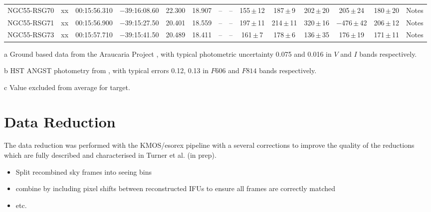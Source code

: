 \begin{table}
\begin{threeparttable}
\begin{tabular}{lrcccccccccccl}
NGC55-RSG70 & xx & 00:15:56.310 & $-$39:16:08.60& 22.300 & 18.907 & --   & --    &   155\,$\pm$\,12 &  187\,$\pm$\,9   &     202\,$\pm$\,20 &   205\,$\pm$\,24             & 180\,$\pm$\,20 & Notes\\
NGC55-RSG71 & xx & 00:15:56.900 & $-$39:15:27.50& 20.401 & 18.559 & --   & --    &   197\,$\pm$\,11 &  214\,$\pm$\,11  &320\,$\pm$\,16\tnote{c}&$-$476\,$\pm$\,42\tnote{c} & 206\,$\pm$\,12 & Notes\\
NGC55-RSG73 & xx & 00:15:57.710 & $-$39:15:41.50& 20.489 & 18.411 & --   & --    &   161\,$\pm$\,7  &  178\,$\pm$\,6   &     136\,$\pm$\,35 &   176\,$\pm$\,19             & 171\,$\pm$\,11 & Notes\\

\hline
\end{tabular}
\begin{tablenotes}
  \item [a] Ground based data from the Araucaria Project
  \protect\cite{2006AJ....132.2556P}, with typical photometric uncertainty 0.075 and 0.016 in $V$ and $I$ bands respectively.
  \item [b] HST ANGST photometry from
  \protect\cite{2009ApJS..183...67D}, with typical errors 0.12, 0.13 in $F606$ and $F814$ bands respectively.
  \item [c] Value excluded from average for target.
\end{tablenotes}
\end{threeparttable}
\end{table}



\section{Data Reduction} %
\label{sec:data_reduction}

The data reduction was performed with the KMOS/esorex pipeline with a several corrections to improve the quality of the reductions which are fully described and characterised in Turner et al. (in prep).

\begin{itemize}
    \item Split recombined sky frames into seeing bins
    \item combine by including pixel shifts between reconstructed IFUs to ensure all frames are correctly matched
    \item etc.
\end{itemize}

